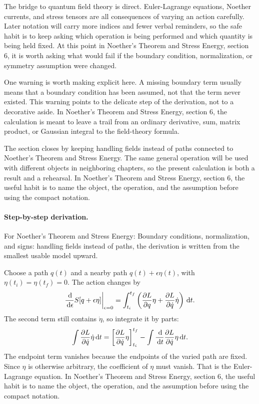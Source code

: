The bridge to quantum field theory is direct.  Euler-Lagrange equations, Noether currents, and stress tensors are all consequences of varying an action carefully.  Later notation will carry more indices and fewer verbal reminders, so the safe habit is to keep asking which operation is being performed and which quantity is being held fixed.  At this point in Noether's Theorem and Stress Energy, section 6, it is worth asking what would fail if the boundary condition, normalization, or symmetry assumption were changed.

One warning is worth making explicit here.  A missing boundary term usually means that a boundary condition has been assumed, not that the term never existed.  This warning points to the delicate step of the derivation, not to a decorative aside.  In Noether's Theorem and Stress Energy, section 6, the calculation is meant to leave a trail from an ordinary derivative, sum, matrix product, or Gaussian integral to the field-theory formula.

The section closes by keeping handling fields instead of paths connected to Noether's Theorem and Stress Energy.  The same general operation will be used with different objects in neighboring chapters, so the present calculation is both a result and a rehearsal.  In Noether's Theorem and Stress Energy, section 6, the useful habit is to name the object, the operation, and the assumption before using the compact notation.



\paragraph{Step-by-step derivation.}

For Noether's Theorem and Stress Energy: Boundary conditions, normalization, and signs: handling fields instead of paths, the derivation is written from the smallest usable model upward.

Choose a path \(q(t)\) and a nearby path \(q(t)+\epsilon\eta(t)\), with \(\eta(t_i)=\eta(t_f)=0\).  The action changes by
\[
  \frac{\,\mathrm d}{\,\mathrm d\epsilon}S[q+\epsilon\eta]\bigg|_{\epsilon=0}
  =
  \int_{t_i}^{t_f}
  \left(
  \frac{\partial L}{\partial q}\eta+\frac{\partial L}{\partial\dot q}\dot\eta
  \right)\,\mathrm d t.
\]
The second term still contains \(\dot\eta\), so integrate it by parts:
\[
  \int \frac{\partial L}{\partial\dot q}\dot\eta\,\mathrm d t
  =
  \left[\frac{\partial L}{\partial\dot q}\eta\right]_{t_i}^{t_f}
  -
  \int \frac{\,\mathrm d}{\,\mathrm d t}\frac{\partial L}{\partial\dot q}\eta\,\mathrm d t.
\]
The endpoint term vanishes because the endpoints of the varied path are fixed.  Since \(\eta\) is otherwise arbitrary, the coefficient of \(\eta\) must vanish.  That is the Euler-Lagrange equation.  In Noether's Theorem and Stress Energy, section 6, the useful habit is to name the object, the operation, and the assumption before using the compact notation.

